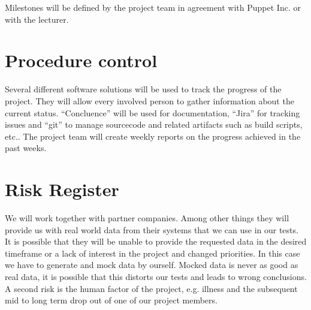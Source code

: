Milestones will be defined by the project team in agreement with Puppet Inc. or
with the lecturer.

\section{Procedure control}

Several different software solutions will be used to track the progress of the
project. They will allow every involved person to gather information about the
current status. ``Concluence'' will be used for documentation, ``Jira'' for tracking
issues and ``git'' to manage sourcecode and related artifacts such as build
scripts, etc.. The project team will create weekly reports on the progress
achieved in the past weeks.

\section{Risk Register}

We will work together with partner companies. Among other things they will
provide us with real world data from their systems that we can use in our tests.
It is possible that they will be unable to provide the requested data in the
desired timeframe or a lack of interest in the project and changed priorities.
In this case we have to generate and mock data by ourself. Mocked data is never
as good as real data, it is possible that this distorts our tests and leads to
wrong conclusions. A second risk is the human factor of the project, e.g.
illness and the subsequent mid to long term drop out of one of our project
members.

